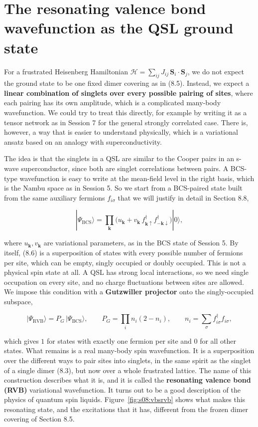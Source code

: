 \section{The resonating valence bond wavefunction as the QSL ground state}

For a frustrated Heisenberg Hamiltonian $\mathcal H = \sum_{ij} J_{ij}\, \mathbf
S_i\cdot\mathbf S_j$, we do not expect the ground state to be one fixed dimer covering as in
(8.5). Instead, we expect a \textbf{linear combination of singlets over every possible pairing of
sites}, where each pairing has its own amplitude, which is a complicated many-body wavefunction. We
could try to treat this directly, for example by writing it as a tensor network as in Session 7 for
the general strongly correlated case. There is, however, a way that is easier to understand
physically, which is a variational ansatz based on an analogy with superconductivity.

The idea is that the singlets in a QSL are similar to the Cooper pairs in an s-wave
superconductor, since both are singlet correlations between pairs. A BCS-type wavefunction is easy
to write at the mean-field level in the right basis, which is the Nambu space as in Session 5. So we
start from a BCS-paired state built from the same auxiliary fermions $f_{i\sigma}$ that we will
justify in detail in Section 8.8,

\begin{equation}
|\Psi_\text{BCS}\rangle = \prod_{\mathbf k}\Big(u_{\mathbf k} + v_{\mathbf k}\,
f^\dagger_{\mathbf k\uparrow} f^\dagger_{-\mathbf k\downarrow}\Big)|0\rangle,
\end{equation}

where $u_{\mathbf k}, v_{\mathbf k}$ are variational parameters, as in the BCS state of Session 5.
By itself, (8.6) is a superposition of states with every possible number of fermions per site,
which can be empty, singly occupied or doubly occupied. This is not a physical spin state at all.
A QSL has strong local interactions, so we need single occupation on every site, and no charge
fluctuations between sites are allowed. We impose this condition with a \textbf{Gutzwiller
projector} onto the singly-occupied subspace,

\begin{equation}
|\Psi_\text{RVB}\rangle = P_G\,|\Psi_\text{BCS}\rangle, \qquad P_G = \prod_i n_i(2-n_i), \qquad
n_i = \sum_\sigma f^\dagger_{i\sigma}f_{i\sigma},
\end{equation}

which gives $1$ for states with exactly one fermion per site and $0$ for all other states. What
remains is a real many-body spin wavefunction. It is a superposition over the different ways to
pair sites into singlets, in the same spirit as the singlet of a single dimer (8.3), but now over a
whole frustrated lattice. The name of this construction describes what it is, and it is called the
\textbf{resonating valence bond (RVB)} variational wavefunction. It turns out to be a good
description of the physics of quantum spin liquids. Figure~\ref{fig:s08:vbsrvb} shows what makes
this resonating state, and the excitations that it has, different from the frozen dimer covering of
Section 8.5.

